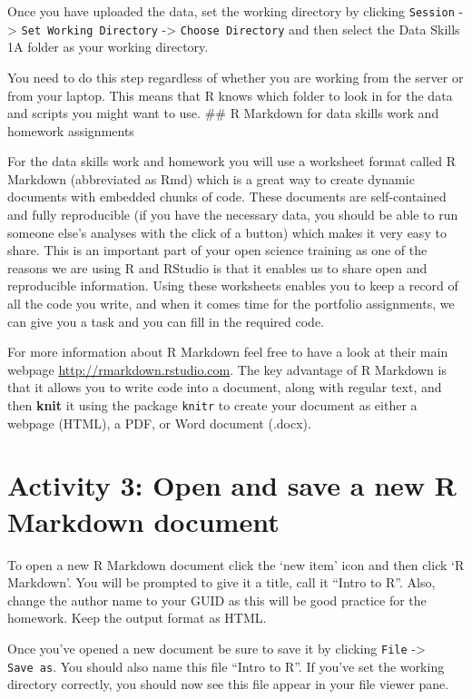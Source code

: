 \documentclass[
  oneside]{book}
\begin{document}
Once you have uploaded the data, set the working directory by clicking \texttt{Session} -\textgreater{} \texttt{Set\ Working\ Directory} -\textgreater{} \texttt{Choose\ Directory} and then select the Data Skills 1A folder as your working directory.

You need to do this step regardless of whether you are working from the server or from your laptop. This means that R knows which folder to look in for the data and scripts you might want to use.
\#\# R Markdown for data skills work and homework assignments

For the data skills work and homework you will use a worksheet format called R Markdown (abbreviated as Rmd) which is a great way to create dynamic documents with embedded chunks of code. These documents are self-contained and fully reproducible (if you have the necessary data, you should be able to run someone else's analyses with the click of a button) which makes it very easy to share. This is an important part of your open science training as one of the reasons we are using R and RStudio is that it enables us to share open and reproducible information. Using these worksheets enables you to keep a record of all the code you write, and when it comes time for the portfolio assignments, we can give you a task and you can fill in the required code.

For more information about R Markdown feel free to have a look at their main webpage \url{http://rmarkdown.rstudio.com}. The key advantage of R Markdown is that it allows you to write code into a document, along with regular text, and then \textbf{knit} it using the package \texttt{knitr} to create your document as either a webpage (HTML), a PDF, or Word document (.docx).

\hypertarget{activity-3-open-and-save-a-new-r-markdown-document}{%
\section{Activity 3: Open and save a new R Markdown document}\label{activity-3-open-and-save-a-new-r-markdown-document}}

To open a new R Markdown document click the `new item' icon and then click `R Markdown'. You will be prompted to give it a title, call it ``Intro to R''. Also, change the author name to your GUID as this will be good practice for the homework. Keep the output format as HTML.

Once you've opened a new document be sure to save it by clicking \texttt{File} -\textgreater{} \texttt{Save\ as}. You should also name this file ``Intro to R''. If you've set the working directory correctly, you should now see this file appear in your file viewer pane.
\end{document}
